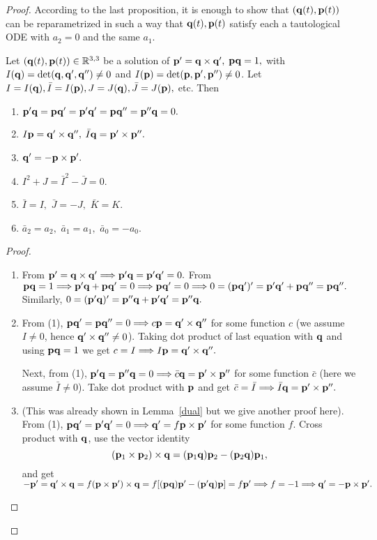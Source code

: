 \begin{proof} According to the last proposition, it is enough to show that $(\q(t), \p(t))$ can be reparametrized in such a way that    $\q(t), \p(t)$ satisfy each a tautological ODE with $a_2=0$ and the same $a_1$. 

 \begin{lemma}\label{mucho} Let $(\q(t),\p(t))\in\Rtt$ be a solution of $\p'=\q\times\q',$ $   \p\q=1,$ with $I(\q)=\det(\q,\q', \q'')\neq 0$ and $ I(\p)=\det(\p,\p', \p'')\neq 0$. Let $I=I(\q), \bar  I=I(\p), J=J(\q), \bar J=J(\p),$ etc. Then 
\begin{enumerate}
\item $\p'\q=\p\q'=\p'\q'=\p\q''=\p''\q=0.$
\item $I\p=\q'\times\q'',$ $\bar I\q=\p'\times\p''.$
\item $\q'=-\p\times\p'.$

\item $I^2+J=\bar I^2- \bar J=0$. 
\item $\bar I=I,$ $\bar J=-J,$ $\bar  K=K.$
\item  $\bar a_2=a_2,$  $\bar a_1=a_1, $  $\bar a_0=-a_0$. 
\end{enumerate}
\end{lemma}

\begin{proof}

\begin{enumerate}[leftmargin=18pt,label=(\arabic*)]\setlength\itemsep{5pt}
\item From $\p'=\q\times \q'\ent \p'\q=\p'\q'=0.$ From $\p\q=1\ent \p'\q+\p\q'=0\ent \p\q'=0\ent 0=(\p\q')'=\p'\q'+ \p\q''=\p\q''.$ Similarly, $0=(\p'\q)'=\p''\q+\p'\q'=\p''\q.$

\item From (1),  $\p\q'=\p\q''=0\ent c\p=\q'\times\q''$ for some function $c$ (we assume $I\neq 0$, hence $\q'\times\q''\neq 0$). Taking dot product of last equation with $\q$ and using $\p\q=1$ we get $c=I\ent I\p=\q'\times\q''.$


 
 Next, from (1), $ \p'\q=\p''\q=0\ent \bar c\q=\p'\times\p''$
  for some function $\bar c$ (here we assume 
  $\bar I\neq 0$). Take dot product with $\p$ and get $\bar c=\bar I \ent \bar I\q=\p'\times \p''.$
 
 \item (This was already shown in Lemma~\ref{dual} but we give another proof here). From (1), $\p\q'=\p'\q'=0\ent \q'=f\p\times\p'$ for some function $f$. Cross product with $\q$, use the vector identity $$(\p_1\times\p_2)\times \q =(\p_1\q)\p_2 - (\p_2\q)\p_1,$$  and get $-\p'=\q'\times \q=f(\p\times\p')\times \q=f[(\p\q)\p'-(\p'\q)\p]=f\p'\ent f=-1\ent \q'=-\p\times\p'.$
   

\end{enumerate}
\end{proof}
\end{proof}
